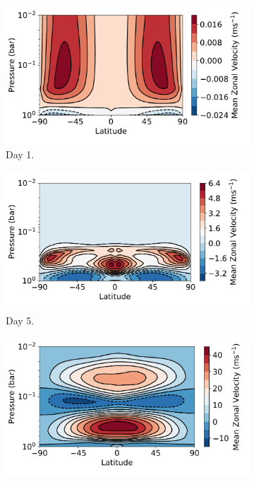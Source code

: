 \begin{figure}
  \centering
  \begin{subfigure}[t]{0.31\textwidth}
    \includegraphics[width=\textwidth]{figures/eqm-zonal-flow/zonal-wind-tide-day1.pdf}
    \caption{Day 1.}
  \end{subfigure}
\enskip
  \begin{subfigure}[t]{0.31\textwidth}
    \includegraphics[width=\textwidth]{figures/eqm-zonal-flow/tl-zonal-u-5day.pdf}
    \caption{Day 5.}
  \end{subfigure}
\enskip
  \begin{subfigure}[t]{0.31\textwidth}
    \includegraphics[width=1.0\textwidth]{figures/eqm-zonal-flow/default-gcm-zonal-flow.pdf}

\end{subfigure}
\end{figure}

